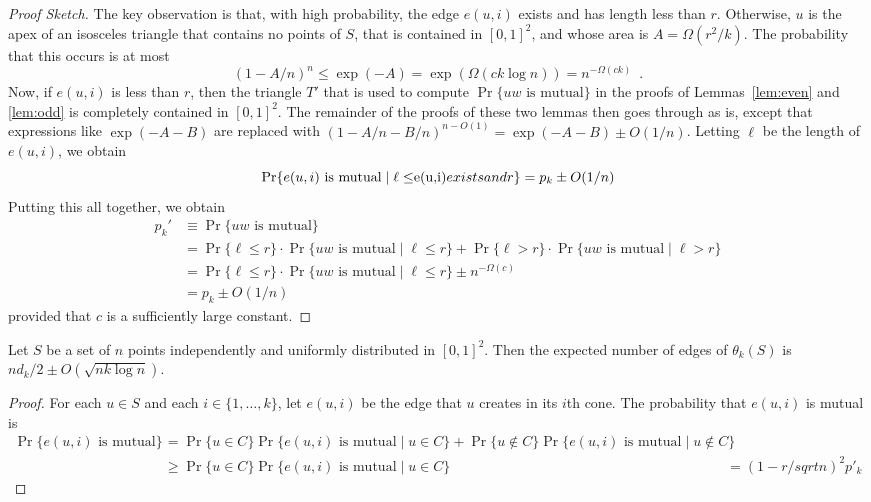 \documentclass{patmorin}
\begin{document}
\begin{proof}[Proof Sketch]
The key observation is that, with high probability, the edge $e(u,i)$
exists and has length less than $r$.  Otherwise, $u$ is the apex of an
isosceles triangle that contains no points of $S$, that is contained in
$[0,1]^2$, and whose area is $A=\Omega(r^2/k)$.  The probability that
this occurs is at most
\[
   (1-A/n)^n \le \exp(-A) = \exp(\Omega(ck\log n)) = n^{-\Omega(ck)} \enspace .
\]
Now, if $e(u,i)$ is less than $r$, then the triangle $T'$ that is
used to compute $\Pr\{\mbox{$uw$ is mutual}\}$ in the proofs of
Lemmas~\ref{lem:even} and \ref{lem:odd} is completely contained in
$[0,1]^2$.  The remainder of the proofs of these two lemmas then
goes through as is, except that expressions like
$\exp(-A-B)$ are replaced with $(1-A/n-B/n)^{n-O(1)}=\exp(-A-B)\pm O(1/n)$.
Letting $\ell$ be the length of $e(u,i)$, we obtain
\[
   \Pr\{\mbox{$e(u,i)$ is mutual}\mid \ell\le $e(u,i)$ exists and r\} = p_k\pm O(1/n)
\]
Putting this all together, we obtain
\begin{align*}
  p_k' & \equiv \Pr\{\mbox{$uw$ is mutual}\} \\
    & = \Pr\{\ell\le r\}\cdot\Pr\{\mbox{$uw$ is mutual}\mid \ell\le r\}
       + \Pr\{\ell> r\}\cdot\Pr\{\mbox{$uw$ is mutual}\mid \ell > r\} \\
    & =  \Pr\{\ell\le r\}\cdot\Pr\{\mbox{$uw$ is mutual}\mid \ell\le r\}
       \pm n^{-\Omega(c)} \\
    & =  p_k\pm O(1/n)
\end{align*}
provided that $c$ is a sufficiently large constant.
\end{proof}

\begin{lem}
 Let $S$ be a set of $n$ points independently and uniformly distributed
 in $[0,1]^2$.  Then the expected number of edges of $\theta_k(S)$ is 
 $nd_k/2\pm O(\sqrt{nk\log n})$.
\end{lem}

\begin{proof}
  For each $u\in S$ and each $i\in\{1,\ldots,k\}$, let $e(u,i)$ be the
  edge that $u$ creates in its $i$th cone.  The probability that $e(u,i)$
  is mutual is
  \begin{align*}
    \Pr\{\mbox{$e(u,i)$ is mutual}\} 
      & = \Pr\{u\in C\}\Pr\{\mbox{$e(u,i)$ is mutual} \mid u\in C\} +
          \Pr\{u\not\in C\}\Pr\{\mbox{$e(u,i)$ is mutual} \mid u\not\in C\} \\
      &\ge\Pr\{u\in C\}\Pr\{\mbox{$e(u,i)$ is mutual} \mid u\in C\} 
      & = (1-r/sqrt{n})^2 p'_k 
  \end{align*}
\end{proof}
\end{document}
